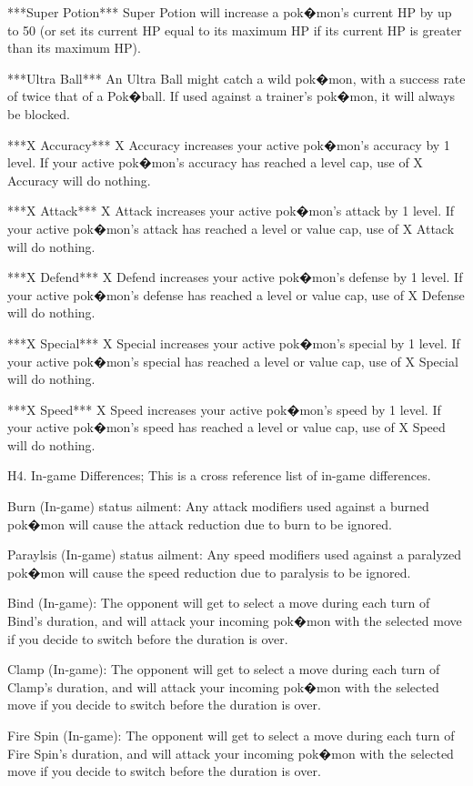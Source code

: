 \documentclass[reprint, aps, prl, paper=A4]{revtex4-1}
\begin{document}
***Super Potion***
Super Potion will increase a pok�mon's current HP by up to 50 (or set its current HP equal to
its maximum HP if its current HP is greater than its maximum HP).

***Ultra Ball***
An Ultra Ball might catch a wild pok�mon, with a success rate of twice that of a Pok�ball. If
used against a trainer's pok�mon, it will always be blocked.

***X Accuracy***
X Accuracy increases your active pok�mon's accuracy by 1 level. If your active pok�mon's
accuracy has reached a level cap, use of X Accuracy will do nothing.

***X Attack***
X Attack increases your active pok�mon's attack by 1 level. If your active pok�mon's attack has
reached a level or value cap, use of X Attack will do nothing.

***X Defend***
X Defend increases your active pok�mon's defense by 1 level. If your active pok�mon's defense
has reached a level or value cap, use of X Defense will do nothing.

***X Special***
X Special increases your active pok�mon's special by 1 level. If your active pok�mon's special
has reached a level or value cap, use of X Special will do nothing.

***X Speed***
X Speed increases your active pok�mon's speed by 1 level. If your active pok�mon's speed has
reached a level or value cap, use of X Speed will do nothing.


H4. In-game Differences;
This is a cross reference list of in-game differences.

Burn (In-game) status ailment:
Any attack modifiers used against a burned pok�mon will cause the attack reduction due to burn
to be ignored.

Paraylsis (In-game) status ailment:
Any speed modifiers used against a paralyzed pok�mon will cause the speed reduction due to
paralysis to be ignored.

Bind (In-game):
The opponent will get to select a move during each turn of Bind's duration, and will attack
your incoming pok�mon with the selected move if you decide to switch before the duration is
over.

Clamp (In-game):
The opponent will get to select a move during each turn of Clamp's duration, and will attack
your incoming pok�mon with the selected move if you decide to switch before the duration is
over.

Fire Spin (In-game):
The opponent will get to select a move during each turn of Fire Spin's duration, and will
attack your incoming pok�mon with the selected move if you decide to switch before the duration
is over.
\end{document}
